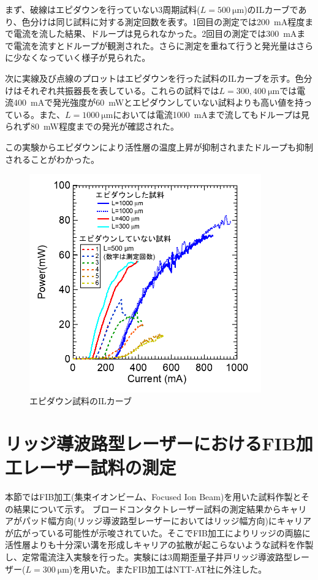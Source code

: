 まず、破線はエピダウンを行っていない3周期試料($L=500\ \si{\micro\metre}$)のILカーブであり、色分けは同じ試料に対する測定回数を表す。1回目の測定では200\ \si{mA}程度まで電流を流した結果、ドループは見られなかった。2回目の測定では300\ \si{mA}まで電流を流すとドループが観測された。さらに測定を重ねて行うと発光量はさらに少なくなっていく様子が見られた。

次に実線及び点線のプロットはエピダウンを行った試料のILカーブを示す。色分けはそれぞれ共振器長を表している。これらの試料では$L=300, 400 \ \si{\micro\metre}$では電流400\ mAで発光強度が60\ mWとエピダウンしていない試料よりも高い値を持っている。また、$L=1000\ \si{\micro\metre}$においては電流1000\ mAまで流してもドループは見られず80\ mW程度までの発光が確認された。

この実験からエピダウンにより活性層の温度上昇が抑制されまたドループも抑制されることがわかった。
\begin{figure}[h]
	\centering
	\includegraphics[width=10cm]{figure/fig_5_1_epidown_IL.png}
	\caption{エピダウン試料のILカーブ}
	\label{fig:fig_5_1_epidown_IL}
\end{figure}

\section{リッジ導波路型レーザーにおけるFIB加工レーザー試料の測定}
本節ではFIB加工(集束イオンビーム、Focused Ion Beam)を用いた試料作製とその結果について示す。
ブロードコンタクトレーザー試料の測定結果からキャリアがパッド幅方向(リッジ導波路型レーザーにおいてはリッジ幅方向)にキャリアが広がっている可能性が示唆されていた。そこでFIB加工によりリッジの両脇に活性層よりも十分深い溝を形成しキャリアの拡散が起こらないような試料を作製し、定常電流注入実験を行った。実験には3周期歪量子井戸リッジ導波路型レーザー($L=300\ \si{\micro\metre}$)を用いた。またFIB加工はNTT-AT社に外注した。

